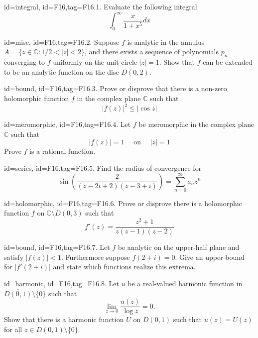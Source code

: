 \documentclass[12pt,letterpaper]{article}
\begin{document}
{%

\item[id=integral, id=F16,tag=F16.1.]
Evaluate the following integral
\[
	\int_{0}^{\infty} \frac{x}{1+x^5} dx
\]
\item[id=misc, id=F16,tag=F16.2.]
Suppose $f$ is analytic in the annulus $A = \{z \in \mathbb{C} \colon 1/2 < | z | < 2\}$, and there exists a sequence of polynomials $p_n$ converging to $f$ uniformly on the unit circle $| z | = 1$. Show that $f$ can be extended to be an analytic function on the disc $D(0,2)$.
\item[id=bound, id=F16,tag=F16.3.]
Prove or disprove that there is a non-zero holomorphic function $f$ in the complex plane $\mathbb{C}$ such that
\[
	| f(z) |^2 \le | \cos z |
\]
\item[id=meromorphic, id=F16,tag=F16.4.]
Let $f$ be meromorphic in the complex plane $\mathbb{C}$ such that
\[
	| f(z) | = 1 \quad \text{ on } \quad | z | = 1
\]
Prove $f$ is a rational function.
	
\item[id=series, id=F16,tag=F16.5.]
Find the radius of convergence for
\[
	\sin\left(\frac{2}{(z-2i+2)(z-3+i)}\right) = \sum_{n=0}^{\infty} a_n z^n
\]
\item[id=holomorphic, id=F16,tag=F16.6.]
Prove or disprove there is a holomorphic function $f$ on $\mathbb{C} \setminus D(0,3)$ such that
\[
	f'(z) = \frac{z^2 + 1}{z(z-1)(z-2)}
\]
\item[id=bound, id=F16,tag=F16.7.]
Let $f$ be analytic on the upper-half plane and satisfy $| f(z) | < 1$. Furthermore suppose $f(2+i) = 0$. Give an upper bound for $| f'(2+i) |$ and state which functions realize this extrema.
\item[id=harmonic, id=F16,tag=F16.8.]
Let $u$ be a real-valued harmonic function in $\overline{D(0,1)} \setminus \{0\}$ such that
\[
	\lim_{z\rightarrow 0} \frac{u(z)}{\log z} = 0.
\]
Show that there is a harmonic function $U$ on $D(0,1)$ such that $u(z) = U(z)$ for all $z \in D(0,1) \setminus \{0\}$.


}
\end{document}
